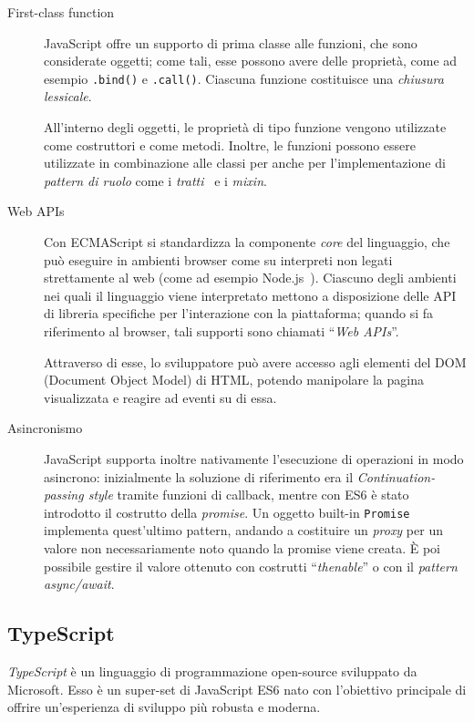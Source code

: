 \begin{description}
        \item[First-class function]
          JavaScript offre un supporto di prima classe alle funzioni, che sono considerate oggetti;
          come tali, esse possono avere delle proprietà, come ad esempio \texttt{.bind()} e \texttt{.call()}. %
          Ciascuna funzione costituisce una \emph{chiusura lessicale}.

          All'interno degli oggetti, le proprietà di tipo funzione vengono utilizzate come costruttori e come metodi.
          Inoltre, le funzioni possono essere utilizzate in combinazione alle classi per  anche per l'implementazione di \emph{pattern di ruolo} come i \emph{tratti}~\cite{10.1145/2093328.2093330} e i \emph{mixin}.

        \item[Web APIs]
          Con ECMAScript si standardizza la componente \emph{core} del linguaggio, che può eseguire in ambienti browser come su interpreti non legati strettamente al web (come ad esempio Node.js~\cite{5617064}).
          Ciascuno degli ambienti nei quali il linguaggio viene interpretato mettono a disposizione delle API di libreria specifiche per l'interazione con la piattaforma;
          quando si fa riferimento al browser, tali supporti sono chiamati ``\emph{Web APIs}''.

          Attraverso di esse, lo sviluppatore può avere accesso agli elementi del DOM (Document Object Model) di HTML, potendo manipolare la pagina visualizzata e reagire ad eventi su di essa.

        \item[Asincronismo]
          JavaScript supporta inoltre nativamente l'esecuzione di operazioni in modo asincrono:
          inizialmente la soluzione di riferimento era il \emph{Continuation-passing style} tramite funzioni di callback, mentre con ES6 è stato introdotto il costrutto della \emph{promise}.
          Un oggetto built-in \texttt{Promise} implementa quest'ultimo pattern, andando a costituire un \emph{proxy} per un valore non necessariamente noto quando la promise viene creata.
          È poi possibile gestire il valore ottenuto con costrutti ``\emph{thenable}'' o con il \emph{pattern async/await}.
      \end{description}

    \subsection{TypeScript}\label{subsec:ts}
      \emph{TypeScript} è un linguaggio di programmazione open-source sviluppato da Microsoft.
      Esso è un super-set di JavaScript ES6 nato con l'obiettivo principale di offrire un'esperienza di sviluppo più robusta e moderna.

